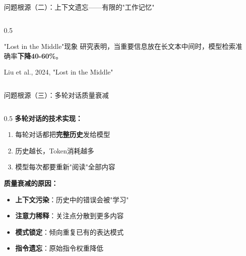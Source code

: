 \documentclass[aspectratio=169,11pt]{beamer}
\begin{document}
\begin{frame}{问题根源（二）：上下文遗忘——有限的"工作记忆"}
\begin{columns}
\begin{column}{0.5\textwidth}
            \begin{alertblock}{"Lost in the Middle"现象}
                \small
                研究表明，当重要信息放在长文本中间时，模型检索准确率\textbf{下降40-60\%}。
                
                \vspace{0.1cm}
                {\scriptsize Liu et al., 2024, "Lost in the Middle"}
            \end{alertblock}
        \end{column}
    \end{columns}
\end{frame}

\begin{frame}{问题根源（三）：多轮对话质量衰减}
    \begin{columns}
        \begin{column}{0.5\textwidth}
            \textbf{多轮对话的技术实现：}
            \begin{enumerate}
                \item 每轮对话都把\textbf{完整历史}发给模型
                \item 历史越长，Token消耗越多
                \item 模型每次都要重新"阅读"全部内容
            \end{enumerate}
            
            \vspace{0.3cm}
            \textbf{质量衰减的原因：}
            \begin{itemize}
                \item \textbf{上下文污染}：历史中的错误会被"学习"
                \item \textbf{注意力稀释}：关注点分散到更多内容
                \item \textbf{模式锁定}：倾向重复已有的表达模式
                \item \textbf{指令遗忘}：原始指令权重降低
            \end{itemize}
            

\end{column}
\end{columns}
\end{frame}
\end{document}
